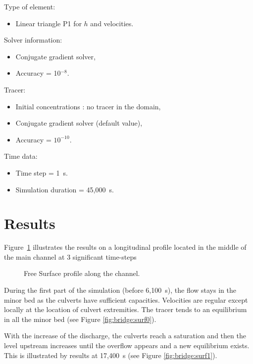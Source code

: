 Type of element:
\begin{itemize}
\item  Linear triangle P1 for $h$ and velocities.
\end{itemize}

Solver information:
\begin{itemize}
\item Conjugate gradient solver,
\item Accuracy = 10$^{-8}$.
\end{itemize}

Tracer:

\begin{itemize}
\item Initial concentrations : no tracer in the domain,
\item Conjugate gradient solver (default value),
\item Accuracy = $10^{-10}$.
\end{itemize}

Time data:

\begin{itemize}
\item Time step = 1~s.
\item Simulation duration = 45,000~s.
\end{itemize}

\section{Results}

Figure~\ref{fig:bridge:profile} illustrates the results on a longitudinal
profile located in the middle of the main channel at 3 significant time-steps
\begin{figure}
\centering
{}
\caption{Free Surface profile along the channel.}\label{fig:bridge:profile}
\end{figure}

During the first part of the simulation (before 6,100~s), the flow stays in the
minor bed as the culverts have sufficient capacities.
Velocities are regular except locally at the location of culvert extremities.
The tracer tends to an equilibrium in all the minor bed
(see Figure \ref{fig:bridge:surf0}).

With the increase of the discharge, the culverts reach a saturation and then the
level upstream increases until the overflow appears and a new equilibrium exists.
This is illustrated by results at 17,400~s (see Figure \ref{fig:bridge:surf1}).
 
